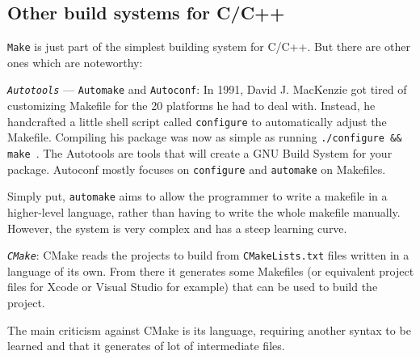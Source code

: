 \subsection{Other build systems for C/C++}
\label{sec:other-build-systems}
\texttt{Make} is just part of the simplest building system for C/C++. But there
are other ones which are noteworthy\cite{c++buildSystems}:
\begin{item-c}
\item \emph{\texttt{Autotools}} --- \texttt{Automake} and \texttt{Autoconf}:
In 1991, David J. MacKenzie got tired of customizing Makefile for the 20
platforms he had to deal with. Instead, he handcrafted a little shell script
called \texttt{configure} to automatically adjust the Makefile.
Compiling his package was now as simple as running \texttt{./configure \&\&
  make}~\cite{automakeManual}. The Autotools are tools that will create a GNU Build System for your
package. Autoconf mostly focuses on \texttt{configure} and \texttt{automake} on Makefiles.

Simply put, \texttt{automake} aims to allow the programmer to write a makefile
in a higher-level language, rather than having to write the whole makefile
manually.
However, the system is very complex and has a steep learning curve.
\item \emph{\texttt{CMake}}:
CMake reads the projects to build from \texttt{CMakeLists.txt} files written in a language of its own. From there it generates some Makefiles (or equivalent project files for Xcode or Visual Studio for example) that can be used to build the project.

The main criticism against CMake is its language, requiring another syntax to be
learned and that it generates of lot of intermediate files.
\end{item-c}
%
